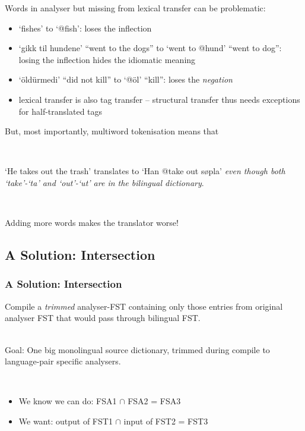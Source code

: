 \documentclass[notes=hide]{beamer}
\newcommand{\form}[1]{`#1'}
\begin{document}
\begin{frame}
  Words in analyser but missing from lexical transfer can be
  problematic:
  \begin{itemize}
  \item \form{fishes} to \form{@fish}: loses the inflection
  \item \form{gikk til hundene} ``went to the dogs'' to
    \form{went to @hund} ``went to dog'': losing the
    inflection hides the idiomatic meaning
  \item \form{öldürmedi} ``did not kill'' to \form{@öl} ``kill'':
    loses the \emph{negation}
  \item lexical transfer is also tag transfer – structural transfer
    thus needs exceptions for half-translated tags
  \end{itemize}
\end{frame}

\begin{frame}
  But, most importantly, multiword tokenisation means that

  ~

  \form{He takes out the trash} translates to \form{Han @take out
    søpla} \emph{even though both \form{take}-\form{ta} and
    \form{out}-\form{ut} are in the bilingual dictionary}.

  ~

  Adding more words makes the translator worse!
\end{frame}

\subsection{A Solution: Intersection}
\begin{frame}
  \frametitle{A Solution: Intersection}
  Compile a \emph{trimmed} analyser-FST containing only those entries
  from original analyser FST that would pass through bilingual FST.

  ~\\

  Goal: One big monolingual source dictionary, trimmed during compile
  to language-pair specific analysers.

  ~\\

  \begin{itemize}
  \item We know we can do: FSA1 $\cap$ FSA2 = FSA3
  \item We want: output of FST1 $\cap$ input of FST2 = FST3
  \end{itemize}

\end{frame}
\end{document}
